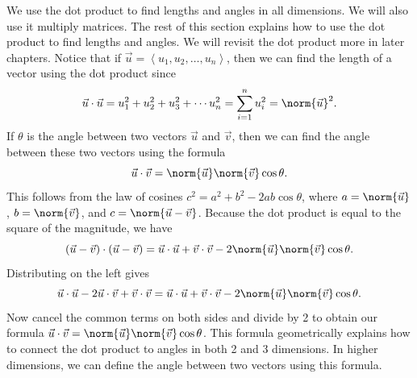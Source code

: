 We use the dot product to find lengths and angles in all dimensions. We will also use it multiply matrices.  The rest of this section explains how to use the dot product to find lengths and angles.  We will revisit the dot product more in later chapters.
Notice that if $\vec u = \left<u_1,u_2,\ldots,u_n\right>$, then we can find the length of a vector using the dot product since
$$\vec u\cdot \vec u = u_1^2+u_2^2+u_3^2+\cdots u_n^2 = \sum_{i=1}^n u_i^2 = \norm{\vec u}^2.$$
If $\theta$ is the angle between two vectors $\vec u$ and $\vec v$, then we can find the angle between these two vectors using the formula 
$$\vec u \cdot \vec v = \norm{\vec u}\norm{\vec v}\cos \theta.$$
This follows from the law of cosines $c^2 = a^2 + b^2 -2ab \cos \theta$, where $a=\norm{\vec u}$, $b=\norm{\vec v}$, and $c = \norm{\vec u-\vec v}$. 
Because the dot product is equal to the square of the magnitude, we have 
$$(\vec u-\vec v)\cdot (\vec u-\vec v) = \vec u\cdot \vec u +\vec v\cdot \vec v -2\norm{\vec u}\norm{\vec v}\cos \theta.$$
Distributing on the left gives 
$$\vec u\cdot \vec u - 2 \vec u \cdot \vec v +\vec v\cdot \vec v = \vec u\cdot \vec u +\vec v\cdot \vec v -2\norm{\vec u}\norm{\vec v}\cos \theta.$$
Now cancel the common terms on both sides and divide by 2 to obtain our formula $\vec u \cdot \vec v = \norm{\vec u}\norm{\vec v}\cos \theta$.  
This formula geometrically explains how to connect the dot product to angles in both 2 and 3 dimensions.  
In higher dimensions, we can define the angle between two vectors using this formula.

